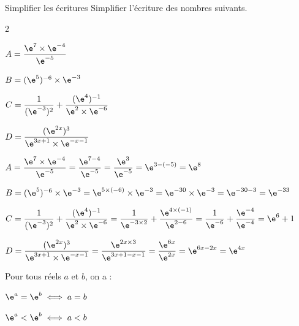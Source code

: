         \begin{bmethodet}{Simplifier les écritures}
             Simplifier l'écriture des nombres suivants.
            \begin{enumMet}
                \begin{multicols}{2}
                    \item $A=\dfrac{\e^7\times\e^{-4}}{\e^{-5}}$
                    \item $B=(\e^5)^{-6}\times \e^{-3}$
                    \item $C=\dfrac{1}{(\e^{-3})^2}+\dfrac{(\e^4)^{-1}}{\e^2\times\e^{-6}}$
                    \item $D=\dfrac{(\e^{2x})^3}{\e^{3x+1}\times \e^{-x-1}}$
                \end{multicols}
            \end{enumMet}
            \begin{enumMet}
                \item $A=\dfrac{\e^7\times\e^{-4}}{\e^{-5}}=\dfrac{\e^{7-4}}{\e^{-5}}=\dfrac{\e^{3}}{\e^{-5}}=\e^{3-(-5)}=\e^8$
                \item $B=(\e^5)^{-6}\times \e^{-3}=\e^{5\times(-6)}\times \e^{-3}=\e^{-30}\times \e^{-3}=\e^{-30-3}=\e^{-33}$
                \item $C=\dfrac{1}{(\e^{-3})^2}+\dfrac{(\e^4)^{-1}}{\e^2\times\e^{-6}}=\dfrac{1}{\e^{-3\times2}}+\dfrac{\e^{4\times(-1)}}{\e^{2-6}}=\dfrac{1}{\e^{-6}}+\dfrac{\e^{-4}}{\e^{-4}}=\e^6+1$
                \item $D=\dfrac{(\e^{2x})^3}{\e^{3x+1}\times \e^{-x-1}}=\dfrac{\e^{2x \times 3}}{\e^{3x+1-x-1}}=\dfrac{\e^{6x}}{\e^{2x}}=\e^{6x-2x}=\e^{4x}$
            \end{enumMet}
        \end{bmethodet}
        \begin{bprops}
            Pour tous réels $a$ et $b$, on a :
            \begin{itemDef}
                \item $\e^a=\e^b \iff a=b$
                \item $\e^a<\e^b \iff a<b$
            \end{itemDef}
        \end{bprops}
